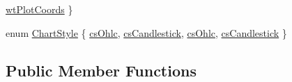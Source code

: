 \begin{DoxyCompactItemize}
\hyperlink{class_q_c_p_financial_aef1761dda71a53dc5269685e9e492626aebf2679f42649543a6cf372741d03ea3}{wt\+Plot\+Coords}
 \}
\item 
enum \hyperlink{class_q_c_p_financial_a0f800e21ee98d646dfc6f8f89d10ebfb}{Chart\+Style} \{ \hyperlink{class_q_c_p_financial_a0f800e21ee98d646dfc6f8f89d10ebfba3acf5bf7e9047684023e3236755768de}{cs\+Ohlc}, 
\hyperlink{class_q_c_p_financial_a0f800e21ee98d646dfc6f8f89d10ebfba70109b20d14e2ff148fdbd500902e567}{cs\+Candlestick}, 
\hyperlink{class_q_c_p_financial_a0f800e21ee98d646dfc6f8f89d10ebfba3acf5bf7e9047684023e3236755768de}{cs\+Ohlc}, 
\hyperlink{class_q_c_p_financial_a0f800e21ee98d646dfc6f8f89d10ebfba70109b20d14e2ff148fdbd500902e567}{cs\+Candlestick}
 \}
\end{DoxyCompactItemize}
\subsection*{Public Member Functions}
